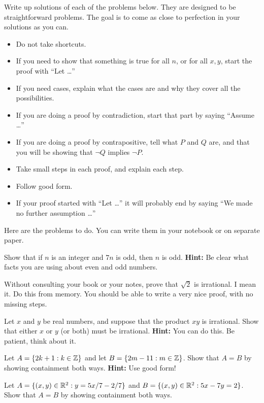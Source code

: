 
Write up solutions of each of the problems below.
They are designed to be straightforward problems.
The goal is to come as close to perfection in your solutions as you can.
\begin{itemize} \itemsep 1pt
\item Do not take shortcuts.
\item If you need to show that something is true for all $n$, or for all $x,y$, start the proof with ``Let \ldots''
\item If you need cases, explain what the cases are and why they cover all the possibilities.
\item If you are doing a proof by contradiction, start that part by saying ``Assume \ldots''
\item If you are doing a proof by contrapositive, tell what $P$ and $Q$ are, and that you will be showing that $\lnot Q$ implies $\lnot P$.
\item Take small steps in each proof, and explain each step.
\item Follow good form.
\item If your proof started with ``Let \ldots'' it will probably end by saying ``We made no further assumption \ldots''
\end{itemize}
Here are the problems to do.  You can write them in your notebook or on separate paper.
\blist{0.1in}
\item Show that if $n$ is an integer and $7n$ is odd, then $n$ is odd.
{\bf Hint:} Be clear what facts you are using about even and odd numbers.

\item Without consulting your book or your notes, prove that $\sqrt{2}$ is irrational.
I mean it.  
Do this from memory.
You should be able to write a very nice proof, with no missing steps.

\item Let $x$ and $y$ be real numbers, and suppose that the product $xy$ is irrational.
Show that either $x$ or $y$ (or both) must be irrational.
{\bf Hint:} You can do this.  Be patient, think about it.

\item Let $A = \{2k+1 : k \in \mathbb{Z}\}$ and let $B = \{ 2m-11 : m \in \mathbb{Z} \}$.
Show that $A = B$ by showing containment both ways.
{\bf Hint:}  Use good form!

\item Let $A = \{ (x,y) \in \mathbb{R}^2 : y = 5x/7 - 2/7 \}$ and $B = \{ (x,y) \in \mathbb{R}^2 : 5x - 7y = 2 \}$.
Show that $A = B$ by showing containment both ways.

